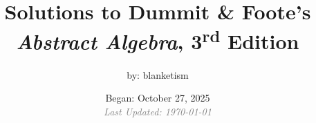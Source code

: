 \documentclass[dummit]{blanketmanual}
\title{Solutions to Dummit \& Foote's \emph{Abstract Algebra}, 3\textsuperscript{rd} Edition}
\author{by: blanketism}
\date{Began: October 27, 2025 \\ \textcolor{gray}{\emph{Last Updated: \today}}}
\begin{document}
\maketitle

\hypertarget{clickabletoc}{}

\tableofcontents










































\end{document}
